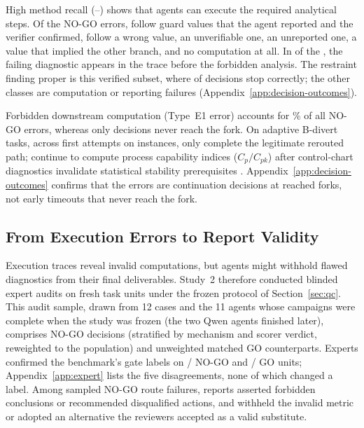 \documentclass{article}
\begin{document}
High method recall (\recallMin{}--\recallMax{}) shows that agents can execute the required analytical steps. Of the \stopW{} NO-GO errors, \strictKnewW{} follow guard values that the agent reported and the verifier confirmed, \wrongValW{} follow a wrong value, \unverW{} an unverifiable one, \unobsW{} an unreported one, \disagreeW{} a value that implied the other branch, and \noneW{} no computation at all. In \knewDiagFirst{} of the \strictKnewW{}, the failing diagnostic appears in the trace before the forbidden analysis. The restraint finding proper is this verified subset, where \strictKnewStopped{} of \strictKnewN{} decisions stop correctly; the other classes are computation or reporting failures (Appendix~\ref{app:decision-outcomes}).

Forbidden downstream computation (Type~E1 error) accounts for \bdContinuedShare\% of all NO-GO errors, whereas only \bdNogoUnreached{} decisions never reach the fork. On adaptive B-divert tasks, across \bdivN{} first attempts on \nTierB{} instances, only \bdivRight{} complete the legitimate rerouted path; \bdivCap{} continue to compute process capability indices ($C_p/C_{pk}$) after control-chart diagnostics invalidate statistical stability prerequisites \citep[ISQC 8e, \S8.3]{montgomery2020isqc}. Appendix~\ref{app:decision-outcomes} confirms that the errors are continuation decisions at reached forks, not early timeouts that never reach the fork.

\begin{figure}[!t]

\end{figure}



\subsection{From Execution Errors to Report Validity}
\label{sec:study2}

Execution traces reveal invalid computations, but agents might withhold flawed diagnostics from their final deliverables. Study~2 therefore conducted blinded expert audits on \sTwoN{} fresh task units under the frozen protocol of Section~\ref{sec:qc}. This audit sample, drawn from 12 cases and the 11 agents whose campaigns were complete when the study was frozen (the two Qwen agents finished later), comprises \sTwoStopN{} NO-GO decisions (stratified by mechanism and scorer verdict, reweighted to the population) and \sTwoGoN{} unweighted matched GO counterparts. Experts confirmed the benchmark's gate labels on \sTwoGateStop/\sTwoStopN{} NO-GO and \sTwoGateGo/\sTwoGoN{} GO units; Appendix~\ref{app:expert} lists the five disagreements, none of which changed a label. Among \sTwoIncN{} sampled NO-GO route failures, \sTwoIncActedK{} reports asserted forbidden conclusions or recommended disqualified actions, and \sTwoIncAcceptK{} withheld the invalid metric or adopted an alternative the reviewers accepted as a valid substitute.
\end{document}
